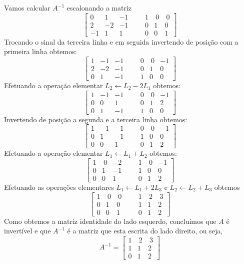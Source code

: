 \begin{solution}
Vamos calcular $A^{-1}$ escalonando a matriz 
$$\left[ \begin{array}{rrrr|rrrr}
 0 &  1 &  -1   & & &     1 &  \ 0 &  \ 0  \\
 2 & -2 &  -1   & & &     0 &    1 &    0 \\
-1 &  1 &   1   & & &     0 &    0 &    1   
\end{array} \right]$$
Trocando o sinal da terceira linha e em seguida invertendo de posição com a primeira linha obtemos:
$$\left[ \begin{array}{rrrr|rrrr}
 1 &  -1 &  -1   & & &     0 & \  0 &   -1 \\
 2 &  -2 &  -1   & & &     0 &    1 &    0 \\
 0 &   1 &  -1   & & &     1 &    0 &    0 
\end{array} \right]$$
Efetuando a operação elementar $L_2 \leftarrow L_2 - 2L_1$ obtemos:
$$\left[ \begin{array}{rrrr|rrrr}
 1 &  -1 &  -1   & & &     0 & \  0 &   -1 \\
 0 &   0 &   1   & & &     0 &    1 &    2 \\
 0 &   1 &  -1   & & &     1 &    0 &    0 
\end{array} \right]$$
Invertendo de posição a segunda e a terceira linha obtemos:
$$\left[ \begin{array}{rrrr|rrrr}
 1 &  -1 &  -1   & & &     0 & \  0 &   -1 \\
 0 &   1 &  -1   & & &     1 &    0 &    0 \\
 0 &   0 &   1   & & &     0 &    1 &    2 
\end{array} \right]$$
Efetuando a operação elementar $L_1 \leftarrow L_1 + L_2$ obtemos:
$$\left[ \begin{array}{rrrr|rrrr}
 1 & \ 0 &  -2   & & &     1 & \  0 &   -1 \\
 0 &   1 &  -1   & & &     1 &    0 &    0 \\
 0 &   0 &   1   & & &     0 &    1 &    2 
\end{array} \right]$$
Efetuando as operações elementares $L_1 \leftarrow L_1 + 2L_3$ e $L_2 \leftarrow L_2 + L_3$ obtemos
$$\left[ \begin{array}{rrrr|rrrr}
 1 & \ 0 & \ 0   & & &     1 & \  2 & \  3 \\
 0 &   1 &   0   & & &     1 &    1 &    2 \\
 0 &   0 &   1   & & &     0 &    1 &    2 
\end{array} \right]$$
Como obtemos a matriz identidade do lado esquerdo, concluímos que $A$ é invertível e que $A^{-1}$ é a matriz que esta escrita do lado direito, ou seja,
$$A^{-1} = \left[ \begin{array}{rrr}
 1 & \  2 & \ 3  \\
 1 &    1 &   2  \\
 0 &    1 &   2 
\end{array} \right]$$


\end{solution}
